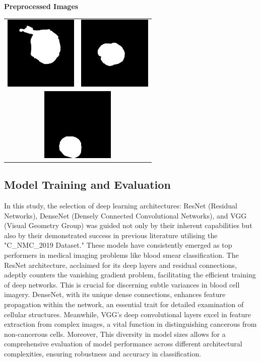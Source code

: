 \documentclass[
	a4paper,
	10pt,
	unnumberedsections,
	twoside,
]{research_article}
\begin{document}
{\centering\textbf{Preprocessed Images}
\begin{tabular}{cc}
	\includegraphics[width=3.5cm]{images/preprocessed_image1.png} & \includegraphics[width=3.5cm]{images/preprocessed_image2.png} \\
	\multicolumn{2}{c}{\includegraphics[width=3.5cm]{images/preprocessed_image3.png}} \\
\end{tabular}
\par}

\subsection{Model Training and Evaluation}

In this study, the selection of deep learning architectures: ResNet (Residual Networks), DenseNet (Densely Connected Convolutional Networks), and VGG (Visual Geometry Group) was guided not only by their inherent capabilities but also by their demonstrated success in previous literature utilising the "C\_NMC\_2019 Dataset." These models have consistently emerged as top performers in medical imaging problems like blood smear classification. The ResNet architecture, acclaimed for its deep layers and residual connections, adeptly counters the vanishing gradient problem, facilitating the efficient training of deep networks. This is crucial for discerning subtle variances in blood cell imagery. DenseNet, with its unique dense connections, enhances feature propagation within the network, an essential trait for detailed examination of cellular structures. Meanwhile, VGG's deep convolutional layers excel in feature extraction from complex images, a vital function in distinguishing cancerous from non-cancerous cells. Moreover, This diversity in model sizes allows for a comprehensive evaluation of model performance across different architectural complexities, ensuring robustness and accuracy in classification.
\end{document}
